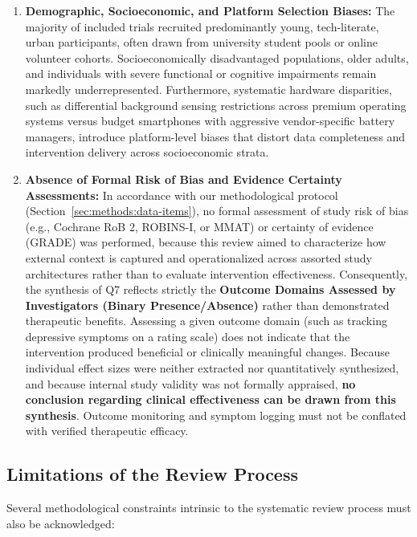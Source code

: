 \begin{enumerate}[label=\textbf{\arabic*.}]
    \item \textbf{Demographic, Socioeconomic, and Platform Selection Biases:} The majority of included trials recruited predominantly young, tech-literate, urban participants, often drawn from university student pools or online volunteer cohorts. Socioeconomically disadvantaged populations, older adults, and individuals with severe functional or cognitive impairments remain markedly underrepresented. Furthermore, systematic hardware disparities, such as differential background sensing restrictions across premium operating systems versus budget smartphones with aggressive vendor-specific battery managers, introduce platform-level biases that distort data completeness and intervention delivery across socioeconomic strata.
    
    \item \textbf{Absence of Formal Risk of Bias and Evidence Certainty Assessments:} In accordance with our methodological protocol (Section~\ref{sec:methods:data-items}), no formal assessment of study risk of bias (e.g., Cochrane RoB 2, ROBINS-I, or MMAT) or certainty of evidence (GRADE) was performed, because this review aimed to characterize how external context is captured and operationalized across assorted study architectures rather than to evaluate intervention effectiveness. Consequently, the synthesis of Q7 reflects strictly the \textbf{Outcome Domains Assessed by Investigators (Binary Presence/Absence)} rather than demonstrated therapeutic benefits. Assessing a given outcome domain (such as tracking depressive symptoms on a rating scale) does not indicate that the intervention produced beneficial or clinically meaningful changes. Because individual effect sizes were neither extracted nor quantitatively synthesized, and because internal study validity was not formally appraised, \textbf{no conclusion regarding clinical effectiveness can be drawn from this synthesis}. Outcome monitoring and symptom logging must not be conflated with verified therapeutic efficacy.
\end{enumerate}

\subsection{Limitations of the Review Process}

Several methodological constraints intrinsic to the systematic review process must also be acknowledged:

